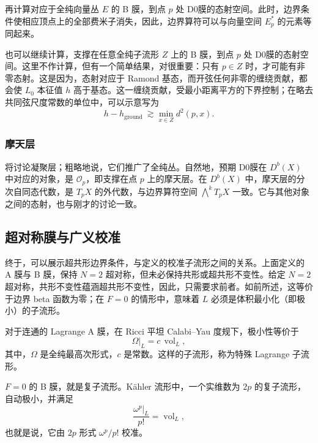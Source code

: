 再计算对应于全纯向量丛 $E$ 的 B 膜，到点 $p$ 处 D0膜的态射空间。此时，边界条件使相应顶点上的全部费米子消失，因此，边界算符可以与向量空间 $E_p^*$ 的元素等同起来。

也可以继续计算，支撑在任意全纯子流形 $Z$ 上的 B 膜，到点 $p$ 处 D0膜的态射空间。这里不作计算，但有一个简单结果，对很重要：只有 $p\in Z$ 时，才可能有非零态射。这是因为，态射对应于 Ramond 基态，而开弦任何非零的缠绕贡献，都会使 $L_0$ 本征值 $h$ 高于基态。这一缠绕贡献，受最小距离平方的下界控制；在略去共同弦尺度常数的单位中，可以示意写为
\[
h-h_{\mathrm{ground}}\ \gtrsim\min_{x\in Z}d^2(p,x).
\]

\subsubsection{摩天层}\label{sec:3.6.5.1}

将讨论凝聚层；粗略地说，它们推广了全纯丛。自然地，预期 D0膜在 $D^b(X)$ 中对应的对象，是 $\mathcal{O}_p$，即支撑在点 $p$ 上的摩天层。在 $D^b(X)$ 中，摩天层的分次自同态代数，是 $T_pX$ 的外代数，与边界算符空间 $\bigwedge^kT_pX$ 一致。它与其他对象之间的态射，也与刚才的讨论一致。

\subsection{超对称膜与广义校准}\label{sec:3.6.6}

终于，可以展示超共形边界条件，与定义的校准子流形之间的关系。上面定义的 A 膜与 B 膜，保持 $N=2$ 超对称，但未必保持共形或超共形不变性。给定 $N=2$ 超对称，共形不变性蕴涵超共形不变性，因此，只需要求前者。如前所述，这等价于边界 beta 函数为零；在 $F=0$ 的情形中，意味着 $L$ 必须是体积最小化（即极小）的子流形。

对于连通的 Lagrange A 膜，在 Ricci 平坦 Calabi--Yau 度规下，极小性等价于
\begin{equation}\label{eq:3.195}
\Omega|_L=c\,\operatorname{vol}_L,
\end{equation}
其中，$\Omega$ 是全纯最高次形式，$c$ 是常数。这样的子流形，称为特殊 Lagrange 子流形。

$F=0$ 的 B 膜，就是复子流形。K\"ahler 流形中，一个实维数为 $2p$ 的复子流形，自动极小，并满足
\[
\frac{\omega^p|_L}{p!}=\operatorname{vol}_L,
\]
也就是说，它由 $2p$ 形式 $\omega^p/p!$ 校准。

